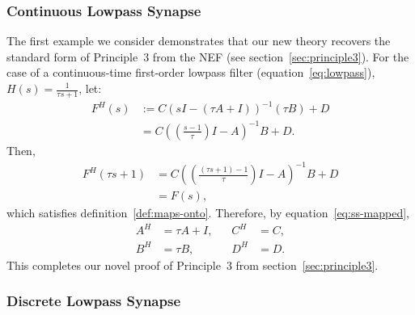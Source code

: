 \subsubsection{Continuous Lowpass Synapse}

The first example we consider demonstrates that our new theory recovers the standard form of Principle~3 from the NEF (see section~\ref{sec:principle3}).
For the case of a continuous-time first-order lowpass filter (equation~\ref{eq:lowpass}), $H(s) = \frac{1}{\tau s + 1}$, let:
\begin{align*}
F^H(s) &:= C \left( sI - (\tau A + I) \right)^{-1} \left( \tau B \right) + D \\
&= C \left( \left(\frac{s-1}{\tau}\right)I - A \right)^{-1}B + D \text{.}
\end{align*}
Then, 
\begin{align*}
F^H \left( \tau s + 1 \right) &= C \left( \left(\frac{(\tau s + 1) - 1}{\tau}\right) I - A \right)^{-1}B + D \\
&= F(s)\text{,} 
\end{align*}
which satisfies definition~\ref{def:maps-onto}.
Therefore, by equation~\ref{eq:ss-mapped},
\begin{equation} \label{eq:p3-novel}
\begin{aligned}
A^H &= \tau A + I \text{,} & \quad C^H &= C \text{,} \\
B^H &= \tau B \text{,} & \quad D^H &= D \text{.}
\end{aligned}
\end{equation}
This completes our novel proof of Principle~3 from section~\ref{sec:principle3}.

\subsubsection{Discrete Lowpass Synapse}

